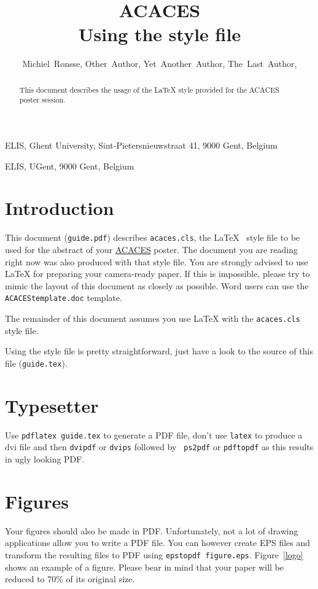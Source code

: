 \documentclass{acaces}
\begin{document}
\title{ACACES\\
Using the style file
}

\author{
Michiel~Ronsse,
Other~Author\comma{},
Yet~Another~Author,
The~Last~Author,
}

\address{1}{
ELIS,
Ghent University,
Sint-Pietersnieuwstraat 41,
9000 Gent,
Belgium
}

\address{2}{
ELIS,
UGent,
9000 Gent,
Belgium
}


\pagestyle{empty}


\begin{abstract}
This document describes the usage of the \LaTeX{} style provided
for the ACACES poster session.
\end{abstract}


\section{Introduction}
This document ({\tt guide.pdf}) describes {\tt acaces.cls}, the
\LaTeX~\cite{latex} style file to be used for the abstract of your 
\href{http://www.hipeac.net/acaces2006/}{ACACES} poster. The document
you are reading right now was also produced with that style file.
You are strongly advised to use \LaTeX{} for preparing your camera-ready paper.
If this is impossible, please try to mimic the layout of this document as
closely as possible. Word users can use the {\tt
ACACEStemplate.doc} template.

The remainder of this document assumes you use \LaTeX{} with the
{\tt acaces.cls} style file.

Using the style file is pretty straightforward, just have a look to the source of this file 
({\tt guide.tex}).


\section{Typesetter}

Use {\tt pdflatex guide.tex} to generate a PDF file, don't use {\tt latex} to
produce a dvi file and then {\tt dvipdf} or {\tt dvips} followed by {\tt
ps2pdf} or {\tt pdftopdf} as this results in ugly looking PDF.

\section{Figures} 
Your figures should also be made in PDF. Unfortunately, not a
lot of drawing applications allow you to write a PDF file. You can however
create EPS files and transform the resulting files to PDF using {\tt epstopdf
figure.eps}. Figure~\ref{logo} shows an example of a figure.
Please bear in mind that your paper will be reduced to 70\% of its
original size.
\end{document}
